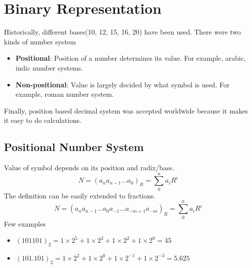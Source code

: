 \documentclass[oneside]{book}
\begin{document}
\chapter{Binary Representation}
Historically, different bases(10, 12, 15, 16, 20) have been used.
There were two kinds of number system
\begin{itemize}
	\item \textbf{Positional}: Position of a number determines its value. For example, arabic, indic number systems.
	\item \textbf{Non-positional}: Value is largely decided by what symbol is used. For example, roman number system.
\end{itemize}
Finally, position based decimal system was accepted worldwide because it makes it easy to do calculations.

\section{Positional Number System}
Value of symbol depends on its position and radix/base.
\[
	N =
	(a_n a_{n-1} \ldots a_0)_R =
	\sum\limits_0^n a_i R^i
\]
The definition can be easily extended to fractions.
\[
	N =
	(a_n a_{n-1} \ldots a_0 a_{-1}\ldots a_{-m + 1} a_{-m})_R =
	\sum\limits_0^n a_i R^i
\]
Few examples
\begin{itemize}
	\item \(\displaystyle (101101)_2 = 1\times 2^{5} + 1\times 2^3 + 1\times 2^2 + 1\times 2^0 = 45\)
	\item \(\displaystyle (101.101)_2 = 1\times 2^{2} + 1\times 2^0 + 1\times 2^{-1} + 1\times 2^{-3} = 5.625\)
\end{itemize}
\end{document}
